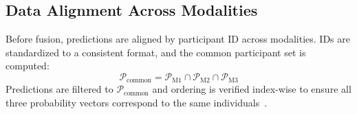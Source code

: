 \documentclass[10pt,letterpaper]{article}
\begin{document}
                                                                                                          \subsection*{Data Alignment Across Modalities}
                                                                                                                          Before fusion, predictions are aligned by participant ID across modalities. IDs are standardized to a consistent format, and the common participant set is computed:
                                                                                                                          \begin{equation} \label{eq_rob:38}
                                                                                                                          \mathcal{P}_{\text{common}}=\mathcal{P}_{\text{M1}}\cap \mathcal{P}_{\text{M2}}\cap \mathcal{P}_{\text{M3}}
                                                                                                                          \end{equation}
                                                                                                                          Predictions are filtered to $\mathcal{P}_{\text{common}}$ and ordering is verified index-wise to ensure all three probability vectors correspond to the same individuals~\cite{ref57}.
\end{document}
